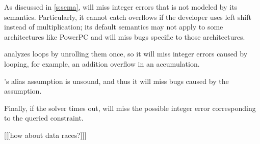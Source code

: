 As discussed in \autoref{s:sema}, \sys will miss integer errors
that is not modeled by its semantics.  Particularly, it cannot catch
overflows if the developer uses left shift instead of multiplication;
its default semantics may not apply to some architectures like
PowerPC and will miss bugs specific to those architectures.

\sys analyzes loops by unrolling them once, so it will miss integer
errors caused by looping, for example, an addition overflow in an
accumulation.

\sys's alias assumption is unsound, and thus it will miss bugs
caused by the assumption.

Finally, if the solver times out, \sys will miss the possible integer
error corresponding to the queried constraint.

[[[how about data races?]]]
